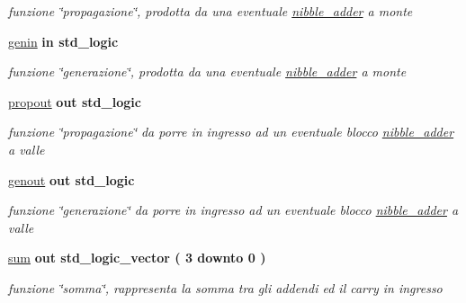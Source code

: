 \begin{DoxyCompactItemize}
\begin{DoxyCompactList}\small\item\em funzione \char`\"{}propagazione\char`\"{}, prodotta da una eventuale \hyperlink{classnibble__adder}{nibble\+\_\+adder} a monte \end{DoxyCompactList}\item 
\hyperlink{group___nibble_adder_ga0a46d5193cb73eb993bc5d4f69741d0a}{genin}  {\bfseries {\bfseries \textcolor{vhdlchar}{in}\textcolor{vhdlchar}{ }}} {\bfseries \textcolor{vhdlchar}{std\+\_\+logic}\textcolor{vhdlchar}{ }} 
\begin{DoxyCompactList}\small\item\em funzione \char`\"{}generazione\char`\"{}, prodotta da una eventuale \hyperlink{classnibble__adder}{nibble\+\_\+adder} a monte \end{DoxyCompactList}\item 
\hyperlink{group___nibble_adder_ga5957c9cdd706cafd2da8855133a002c9}{propout}  {\bfseries {\bfseries \textcolor{vhdlchar}{out}\textcolor{vhdlchar}{ }}} {\bfseries \textcolor{vhdlchar}{std\+\_\+logic}\textcolor{vhdlchar}{ }} 
\begin{DoxyCompactList}\small\item\em funzione \char`\"{}propagazione\char`\"{} da porre in ingresso ad un eventuale blocco \hyperlink{classnibble__adder}{nibble\+\_\+adder} a valle \end{DoxyCompactList}\item 
\hyperlink{group___nibble_adder_ga068cd5c4d23e284cb942702252ed1491}{genout}  {\bfseries {\bfseries \textcolor{vhdlchar}{out}\textcolor{vhdlchar}{ }}} {\bfseries \textcolor{vhdlchar}{std\+\_\+logic}\textcolor{vhdlchar}{ }} 
\begin{DoxyCompactList}\small\item\em funzione \char`\"{}generazione\char`\"{} da porre in ingresso ad un eventuale blocco \hyperlink{classnibble__adder}{nibble\+\_\+adder} a valle \end{DoxyCompactList}\item 
\hyperlink{group___nibble_adder_gadfe538323c3296159dd3b383325a996b}{sum}  {\bfseries {\bfseries \textcolor{vhdlchar}{out}\textcolor{vhdlchar}{ }}} {\bfseries \textcolor{vhdlchar}{std\+\_\+logic\+\_\+vector}\textcolor{vhdlchar}{ }\textcolor{vhdlchar}{(}\textcolor{vhdlchar}{ }\textcolor{vhdlchar}{ } \textcolor{vhdldigit}{3} \textcolor{vhdlchar}{ }\textcolor{vhdlchar}{downto}\textcolor{vhdlchar}{ }\textcolor{vhdlchar}{ } \textcolor{vhdldigit}{0} \textcolor{vhdlchar}{ }\textcolor{vhdlchar}{)}\textcolor{vhdlchar}{ }} 
\begin{DoxyCompactList}\small\item\em funzione \char`\"{}somma\char`\"{}, rappresenta la somma tra gli addendi ed il carry in ingresso \end{DoxyCompactList}\end{DoxyCompactItemize}


